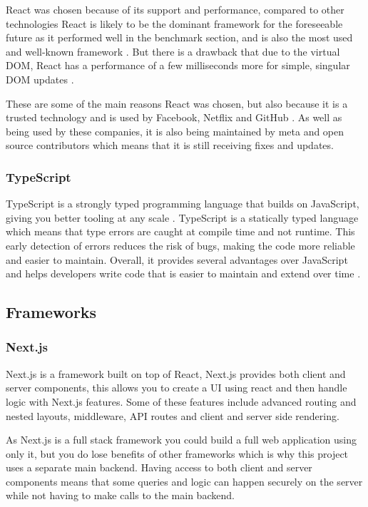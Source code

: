 \documentclass[]{project_report}
\begin{document}
React was chosen because of its support and performance, compared to other technologies React is likely to be the dominant framework for the foreseeable future \cite{frontend_framework_comparison} as it performed well in the benchmark section, and is also the most used and well-known framework \cite{frontend_framework_comparison}. But there is a drawback that due to the virtual DOM, React has a performance of a few milliseconds more for simple, singular DOM updates \cite{frontend_framework_comparison}.

These are some of the main reasons React was chosen, but also because it is a trusted technology and is used by Facebook, Netflix and GitHub \cite{react_stats}. As well as being used by these companies, it is also being maintained by meta and open source contributors which means that it is still receiving fixes and updates.

\subsubsection{TypeScript}

TypeScript is a strongly typed programming language that builds on JavaScript, giving you better tooling at any scale \cite{typescript}. TypeScript is a statically typed language which means that type errors are caught at compile time and not runtime. This early detection of errors reduces the risk of bugs, making the code more reliable and easier to maintain. Overall, it provides several advantages over JavaScript \cite{javascript_alternatives} and helps developers write code that is easier to maintain and extend over time \cite{javascript_alternatives}.


\subsection{Frameworks}
\subsubsection{Next.js}

Next.js is a framework built on top of React, Next.js provides both client and server components, this allows you to create a UI using react and then handle logic with Next.js features. Some of these features include advanced routing and nested layouts, middleware, API routes and client and server side rendering.

As Next.js is a full stack framework you could build a full web application using only it, but you do lose benefits of other frameworks which is why this project uses a separate main backend. Having access to both client and server components means that some queries and logic can happen securely on the server while not having to make calls to the main backend.
\end{document}
